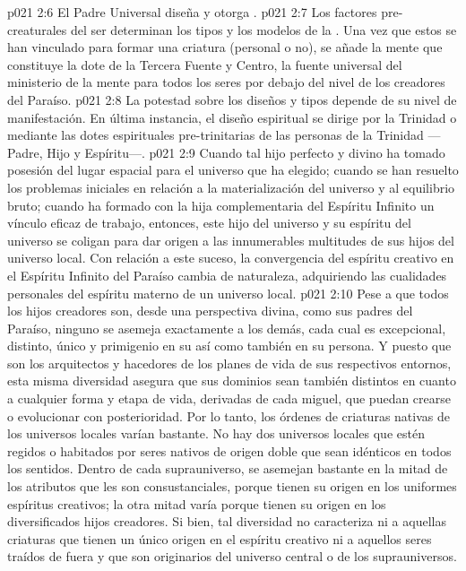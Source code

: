 \vs p021 2:6 El Padre Universal diseña y otorga .
\vs p021 2:7 \pc Los factores pre\hyp{}creaturales del ser determinan los tipos y los modelos de la . Una vez que estos se han vinculado para formar una criatura (personal o no), se añade la mente que constituye la dote de la Tercera Fuente y Centro, la fuente universal del ministerio de la mente para todos los seres por debajo del nivel de los creadores del Paraíso.
\vs p021 2:8 \pc La potestad sobre los diseños y tipos  depende de su nivel de manifestación. En última instancia, el diseño espiritual se dirige por la Trinidad o mediante las dotes espirituales pre\hyp{}trinitarias de las personas de la Trinidad ---Padre, Hijo y Espíritu---.
\vs p021 2:9 \pc Cuando tal hijo perfecto y divino ha tomado posesión del lugar espacial para el universo que ha elegido; cuando se han resuelto los problemas iniciales en relación a la materialización del universo y al equilibrio bruto; cuando ha formado con la hija complementaria del Espíritu Infinito un vínculo eficaz de trabajo, entonces, este hijo del universo y su espíritu del universo se coligan para dar origen a las innumerables multitudes de sus hijos del universo local. Con relación a este suceso, la convergencia del espíritu creativo en el Espíritu Infinito del Paraíso cambia de naturaleza, adquiriendo las cualidades personales del espíritu materno de un universo local.
\vs p021 2:10 Pese a que todos los hijos creadores son, desde una perspectiva divina, como sus padres del Paraíso, ninguno se asemeja exactamente a los demás, cada cual es excepcional, distinto, único y primigenio en su  así como también en su persona. Y puesto que son los arquitectos y hacedores de los planes de vida de sus respectivos entornos, esta misma diversidad asegura que sus dominios sean también distintos en cuanto a cualquier forma y etapa de vida, derivadas de cada miguel, que puedan crearse o evolucionar con posterioridad. Por lo tanto, los órdenes de criaturas nativas de los universos locales varían bastante. No hay dos universos locales que estén regidos o habitados por seres nativos de origen doble que sean idénticos en todos los sentidos. Dentro de cada suprauniverso, se asemejan bastante en la mitad de los atributos que les son consustanciales, porque tienen su origen en los uniformes espíritus creativos; la otra mitad varía porque tienen su origen en los diversificados hijos creadores. Si bien, tal diversidad no caracteriza ni a aquellas criaturas que tienen un único origen en el espíritu creativo ni a aquellos seres traídos de fuera y que son originarios del universo central o de los suprauniversos.
